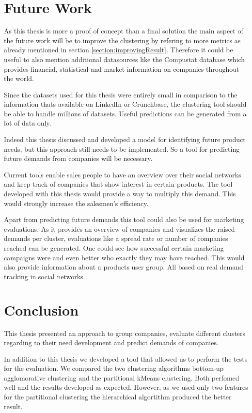\section{Future Work}
As this thesis is more a proof of concept than a final solution the main aspect of the
future work will be to improve the clustering by refering to more metrics as already mentioned
in section \ref{section:improvingResult}. Therefore it could be useful to also mention additional
datasources like the Compustat database which provides financial, statistical and market information
on companies throughout the world.

Since the datasets used for this thesis were entirely small in comparison to the information thats available
on LinkedIn or Crunchbase, the clustering tool should be able to handle millions of datasets. Useful predictions can
be generated from a lot of data only.

Indeed this thesis discussed and developed a model for identifying future product needs, but this approach still
needs to be implemented. So a tool for predicting future demands from companies will be necessary.

Current tools enable sales people to have an overview over their social networks and keep track of
companies that show interest in certain products. The tool developed with this thesis would provide
a way to multiply this demand. This would strongly increase the salesmen's efficiency.

Apart from predicting future demands this tool could also be used for marketing evaluations. As it provides
an overview of companies and visualizes the raised demands per cluster, evaluations like a spread rate or
number of companies reached can be generated. One could see how successful certain marketing campaigns were
and even better who exactly they may have reached. This would also provide information about a products user group.
All based on real demand tracking in social networks.

\clearpage

\section{Conclusion}
This thesis presented an approach to group companies, evaluate different clusters regarding
to their need development and predict demands of companies.

In addition to this thesis we developed a tool that allowed us to perform the tests for the evaluation.
We compared the two clustering algorithms bottom-up agglomorative clustering and the partitional kMeans clustering.
Both perfomed well and the results developed as expected. However, as we used only two features for the
partitional clustering the hierarchical algortithm produced the better result.


